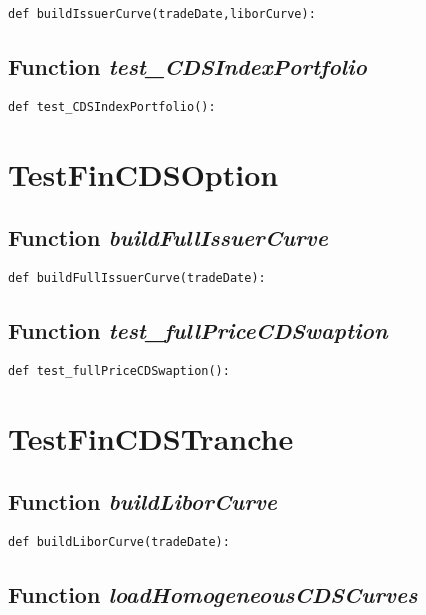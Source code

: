 \documentclass[twoside,11pt]{book}
\begin{document}
\begin{lstlisting}
def buildIssuerCurve(tradeDate,liborCurve):
\end{lstlisting}

\subsection{Function {\it test\_CDSIndexPortfolio}}


\begin{lstlisting}
def test_CDSIndexPortfolio():
\end{lstlisting}


\newpage
\section{TestFinCDSOption}

\subsection{Function {\it buildFullIssuerCurve}}


\begin{lstlisting}
def buildFullIssuerCurve(tradeDate):
\end{lstlisting}

\subsection{Function {\it test\_fullPriceCDSwaption}}


\begin{lstlisting}
def test_fullPriceCDSwaption():
\end{lstlisting}


\newpage
\section{TestFinCDSTranche}

\subsection{Function {\it buildLiborCurve}}


\begin{lstlisting}
def buildLiborCurve(tradeDate):
\end{lstlisting}

\subsection{Function {\it loadHomogeneousCDSCurves}}
\end{document}
